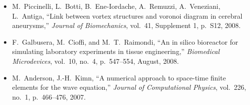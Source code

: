 \begin{frame}[t]
\begin{itemize}
  \item{
      M.~Piccinelli, L.~Botti, B.~Ene-Iordache, A.~Remuzzi,
      A.~Veneziani, L.~Antiga,
      ``Link between vortex structures and voronoi diagram in cerebral aneurysms,''
      \emph{Journal of Biomechanics}, vol.~41, Supplement 1, p.~S12, 2008.
    }
    \item{
        F.~Galbusera, M.~Cioffi, and M.~T.~Raimondi, 
        ``An in silico bioreactor for simulating laboratory experiments in 
        tissue engineering,'' \emph{Biomedical Microdevices}, vol.~10, no.~4, p.~547--554, August, 2008.
      }
  \item{
      M.~Anderson, J.-H.~Kimn,
      ``A numerical approach to space-time finite elements for the wave equation,''
      \emph{Journal of Computational Physics}, vol.~226, no.~1, p.~466--476, 2007.
    }

    \end{itemize}
\end{frame}




